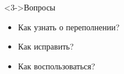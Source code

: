 \documentclass[pdf,9pt,aspectratio=169]{beamer}
\begin{document}
\begin{frame}[fragile]
\begin{columns}[T]
\begin{column}[]{0.45\textwidth}
\begin{alertblock}
\begin{center}
        \end{center}
      \end{alertblock}
    \end{column}
  \end{columns}
\hspace{1cm}
  \begin{columns}[T]
    \begin{column}[]{0.45\textwidth}  
      \begin{block}<3->{Вопросы}
        \begin{itemize}
          \item Как узнать о переполнении?
          \item Как исправить?
          \item Как воспользоваться?
       \end{itemize}
     \end{block}
    \end{column}
  \end{columns}
\end{frame}
\end{document}
